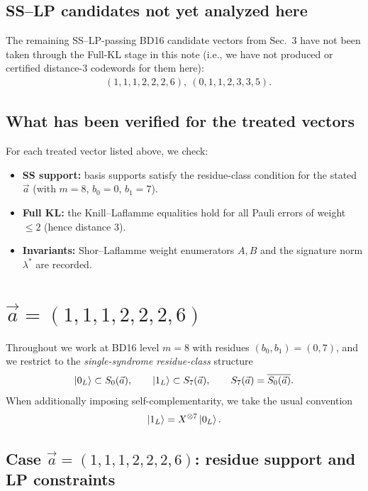 \documentclass[11pt]{article}
\begin{document}
\subsection{SS--LP candidates not yet analyzed here}

The remaining SS--LP-passing BD16 candidate vectors from Sec.~3 have not been taken through the Full-KL stage in this note (i.e., we have not produced or certified distance-3 codewords for them here):
\[
\begin{aligned}
&(1,1,1,2,2,2,6),\ (0,1,1,2,3,3,5).
\end{aligned}
\]

\subsection{What has been verified for the treated vectors}

For each treated vector listed above, we check:
\begin{itemize}
\item \textbf{SS support:} basis supports satisfy the residue-class condition for the stated \(\vec a\) (with \(m=8\), \(b_0=0\), \(b_1=7\)).
\item \textbf{Full KL:} the Knill--Laflamme equalities hold for all Pauli errors of weight \(\le 2\) (hence distance \(3\)).
\item \textbf{Invariants:} Shor--Laflamme weight enumerators \(A,B\) and the signature norm \(\lambda^\ast\) are recorded.
\end{itemize}

\section{\texorpdfstring{$\vec a=(1,1,1,2,2,2,6)$}{a=(1,1,1,2,2,2,6)}}

Throughout we work at BD16 level \(m=8\) with residues \((b_0,b_1)=(0,7)\), and we restrict to the
\emph{single-syndrome residue-class} structure
\[
\ket{0_L}\subset S_0(\vec a),\qquad \ket{1_L}\subset S_7(\vec a),
\qquad S_7(\vec a)=\overline{S_0(\vec a)}.
\]
When additionally imposing self-complementarity, we take the usual convention
\[
\ket{1_L}=X^{\otimes 7}\ket{0_L}.
\]

\subsection{Case \texorpdfstring{$\vec a=(1,1,1,2,2,2,6)$}{a=(1,1,1,2,2,2,6)}: residue support and LP constraints}
\end{document}

